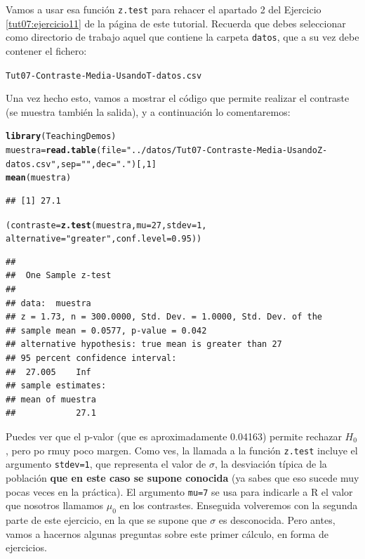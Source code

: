 \documentclass[10pt,a4paper]{article}\usepackage[]{graphicx}\usepackage[]{color}
\makeatletter
\newcommand{\hlnum}[1]{\textcolor[rgb]{0.686,0.059,0.569}{#1}}%
\newcommand{\hlstr}[1]{\textcolor[rgb]{0.192,0.494,0.8}{#1}}%
\newcommand{\hlstd}[1]{\textcolor[rgb]{0.345,0.345,0.345}{#1}}%
\newcommand{\hlkwb}[1]{\textcolor[rgb]{0.69,0.353,0.396}{#1}}%
\newcommand{\hlkwc}[1]{\textcolor[rgb]{0.333,0.667,0.333}{#1}}%
\newcommand{\hlkwd}[1]{\textcolor[rgb]{0.737,0.353,0.396}{\textbf{#1}}}%
\newenvironment{kframe}{%
 \def\at@end@of@kframe{}%
 \ifinner\ifhmode%
  \def\at@end@of@kframe{\end{minipage}}%
  \begin{minipage}{\columnwidth}%
 \fi\fi%
 \def\FrameCommand##1{\hskip\@totalleftmargin \hskip-\fboxsep
 \colorbox{shadecolor}{##1}\hskip-\fboxsep
     \hskip-\linewidth \hskip-\@totalleftmargin \hskip\columnwidth}%
 \MakeFramed {\advance\hsize-\width
   \@totalleftmargin\z@ \linewidth\hsize
   \@setminipage}}%
 {\par\unskip\endMakeFramed%
 \at@end@of@kframe}
\newenvironment{knitrout}{}{} %
\newcounter {cont01}
\makeatother
\begin{document}
Vamos a usar esa función {\tt z.test} para rehacer el apartado 2 del Ejercicio \ref{tut07:ejercicio11} de la página \pageref{tut07:ejercicio11} de este tutorial. Recuerda que debes seleccionar como directorio de trabajo aquel que contiene la carpeta {\tt datos}, que a su vez debe contener el fichero:
\begin{center}
{\tt Tut07-Contraste-Media-UsandoT-datos.csv}
\end{center}
Una vez hecho esto, vamos a mostrar el código que permite realizar el contraste (se muestra también la salida), y a continuación lo comentaremos:
\begin{knitrout}
\color{fgcolor}\begin{kframe}
\begin{alltt}
\hlkwd{library}\hlstd{(TeachingDemos)}
\hlstd{muestra} \hlkwb{=} \hlkwd{read.table}\hlstd{(}\hlkwc{file}\hlstd{=}\hlstr{"../datos/Tut07-Contraste-Media-UsandoZ-datos.csv"}\hlstd{,}\hlkwc{sep}\hlstd{=}\hlstr{" "}\hlstd{,}\hlkwc{dec}\hlstd{=}\hlstr{"."}\hlstd{)[,}\hlnum{1}\hlstd{]}
\hlkwd{mean}\hlstd{(muestra)}
\end{alltt}
\begin{verbatim}
## [1] 27.1
\end{verbatim}
\begin{alltt}
\hlstd{(contraste} \hlkwb{=} \hlkwd{z.test}\hlstd{(muestra,} \hlkwc{mu} \hlstd{=} \hlnum{27}\hlstd{,} \hlkwc{stdev} \hlstd{=} \hlnum{1}\hlstd{,}
  \hlkwc{alternative}\hlstd{=}\hlstr{"greater"}\hlstd{,} \hlkwc{conf.level} \hlstd{=} \hlnum{0.95}\hlstd{))}
\end{alltt}
\begin{verbatim}
## 
## 	One Sample z-test
## 
## data:  muestra
## z = 1.73, n = 300.0000, Std. Dev. = 1.0000, Std. Dev. of the
## sample mean = 0.0577, p-value = 0.042
## alternative hypothesis: true mean is greater than 27
## 95 percent confidence interval:
##  27.005    Inf
## sample estimates:
## mean of muestra 
##            27.1
\end{verbatim}
\end{kframe}
\end{knitrout}

Puedes ver que el p-valor (que es aproximadamente 0.04163) permite rechazar $H_0$, pero po rmuy poco margen. Como ves, la llamada a la función {\tt z.test} incluye el argumento {\tt stdev=1}, que representa el valor de $\sigma$, la desviación típica de la población {\bf que en este caso se supone conocida} (ya sabes que eso sucede muy pocas veces en la práctica). El argumento {\tt mu=7} se usa para indicarle a R el valor que nosotros llamamos $\mu_0$ en los contrastes. Enseguida volveremos con la segunda parte de este ejercicio, en la que se supone que $\sigma$ es desconocida. Pero antes, vamos a hacernos algunas preguntas sobre este primer cálculo, en forma de ejercicios.
\end{document}
